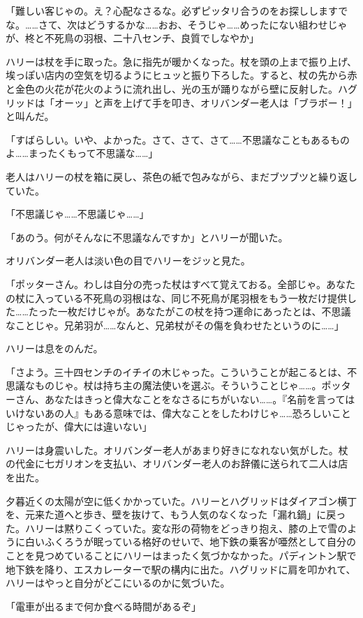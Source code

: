 \documentclass[10pt,a4paper]{article}
\begin{document}
\begin{CJK}{UTF8}{min}
「難しい客じゃの。え？心配なさるな。必ずピッタリ合うのをお探ししますでな。……さて、次はどうするかな……おお、そうじゃ……めったにない組わせじゃが、柊と不死鳥の羽根、二十八センチ、良質でしなやか」

ハリーは杖を手に取った。急に指先が暖かくなった。杖を頭の上まで振り上げ、埃っぽい店内の空気を切るようにヒュッと振り下ろした。すると、杖の先から赤と金色の火花が花火のように流れ出し、光の玉が踊りながら壁に反射した。ハグリッドは「オーッ」と声を上げて手を叩き、オリバンダー老人は「ブラボー！」と叫んだ。

「すばらしい。いや、よかった。さて、さて、さて……不思議なこともあるものよ……まったくもって不思議な……」

老人はハリーの杖を箱に戻し、茶色の紙で包みながら、まだブツブツと繰り返していた。

「不思議じゃ……不思議じゃ……」

「あのう。何がそんなに不思議なんですか」とハリーが聞いた。

オリバンダー老人は淡い色の目でハリーをジッと見た。

「ポッターさん。わしは自分の売った杖はすべて覚えておる。全部じゃ。あなたの杖に入っている不死鳥の羽根はな、同じ不死鳥が尾羽根をもう一枚だけ提供した……たった一枚だけじゃが。あなたがこの杖を持つ運命にあったとは、不思議なことじゃ。兄弟羽が……なんと、兄弟杖がその傷を負わせたというのに……」

ハリーは息をのんだ。

「さよう。三十四センチのイチイの木じゃった。こういうことが起こるとは、不思議なものじゃ。杖は持ち主の魔法使いを選ぶ。そういうことじゃ……。ポッターさん、あなたはきっと偉大なことをなさるにちがいない……。『名前を言ってはいけないあの人』もある意味では、偉大なことをしたわけじゃ……恐ろしいことじゃったが、偉大には違いない」

ハリーは身震いした。オリバンダー老人があまり好きになれない気がした。杖の代金に七ガリオンを支払い、オリバンダー老人のお辞儀に送られて二人は店を出た。

夕暮近くの太陽が空に低くかかっていた。ハリーとハグリッドはダイアゴン横丁を、元来た道へと歩き、壁を抜けて、もう人気のなくなった「漏れ鍋」に戻った。ハリーは黙りこくっていた。変な形の荷物をどっきり抱え、膝の上で雪のように白いふくろうが眠っている格好のせいで、地下鉄の乗客が唖然として自分のことを見つめていることにハリーはまったく気づかなかった。パディントン駅で地下鉄を降り、エスカレーターで駅の構内に出た。ハグリッドに肩を叩かれて、ハリーはやっと自分がどこにいるのかに気づいた。

「電車が出るまで何か食べる時間があるぞ」


\end{CJK}
\end{document}
